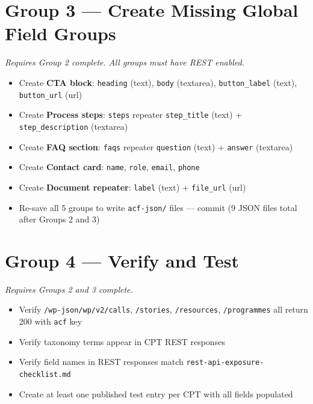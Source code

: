 \documentclass[11pt,a4paper]{article}
\begin{document}
\section{Group 3 --- Create Missing Global Field Groups}

\textit{Requires Group 2 complete. All groups must have REST enabled.}

\begin{itemize}
    \item[$\square$] Create \textbf{CTA block}: \texttt{heading} (text), \texttt{body} (textarea), \texttt{button\_label} (text), \texttt{button\_url} (url)
    \item[$\square$] Create \textbf{Process steps}: \texttt{steps} repeater \textrightarrow{} \texttt{step\_title} (text) + \texttt{step\_description} (textarea)
    \item[$\square$] Create \textbf{FAQ section}: \texttt{faqs} repeater \textrightarrow{} \texttt{question} (text) + \texttt{answer} (textarea)
    \item[$\square$] Create \textbf{Contact card}: \texttt{name}, \texttt{role}, \texttt{email}, \texttt{phone}
    \item[$\square$] Create \textbf{Document repeater}: \texttt{label} (text) + \texttt{file\_url} (url)
    \item[$\square$] Re-save all 5 groups to write \texttt{acf-json/} files --- commit (9 JSON files total after Groups 2 and 3)
\end{itemize}

\section{Group 4 --- Verify and Test}

\textit{Requires Groups 2 and 3 complete.}

\begin{itemize}
    \item[$\square$] Verify \texttt{/wp-json/wp/v2/calls}, \texttt{/stories}, \texttt{/resources}, \texttt{/programmes} all return 200 with \texttt{acf} key
    \item[$\square$] Verify taxonomy terms appear in CPT REST responses
    \item[$\square$] Verify field names in REST responses match \texttt{rest-api-exposure-checklist.md}
    \item[$\square$] Create at least one published test entry per CPT with all fields populated
\end{itemize}
\end{document}
